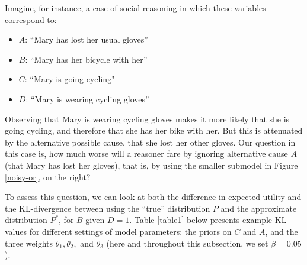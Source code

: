 \documentclass[10pt,letterpaper]{article}
\begin{document}
\noindent Imagine, for instance, a case of social reasoning in which these variables correspond to: 
\begin{itemize} 
  \setlength\itemsep{1pt}
\item[] $A$: ``Mary has lost her usual gloves'' \item[] $B$: ``Mary has her bicycle with her''  \item[] $C$: ``Mary is going cycling"  \item[] $D$:  ``Mary is wearing cycling gloves'' \end{itemize}
Observing that Mary is wearing cycling gloves makes it more likely that she is going cycling, and therefore that she has her bike with her. But this is attenuated by the alternative possible cause, that she lost her other gloves. Our question in this case is, how much worse will a reasoner fare by ignoring alternative cause $A$ (that Mary has lost her gloves), that is, by using the smaller submodel  in Figure \ref{noisy-or}, on the right?

To assess this question, we can look at both the difference in expected utility and the KL-divergence between using the ``true'' distribution $P$ and the approximate distribution $P^*$, for $B$ given $D=1$. Table \ref{table1} below presents example KL-values for different settings of model parameters: the priors on $C$ and $A$, and the three weights $\theta_1,\theta_2,$ and $\theta_3$ (here and throughout this subsection, we set $\beta = 0.05$).
\end{document}
